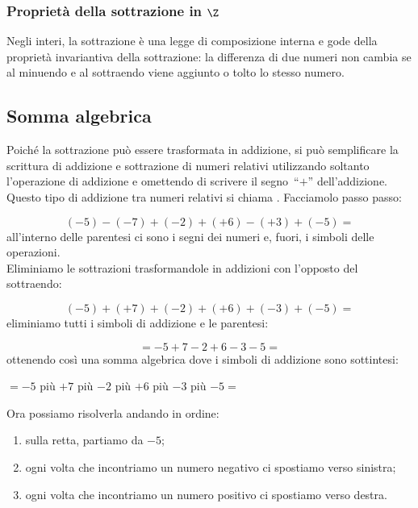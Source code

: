 \subsubsection{Proprietà della sottrazione in \texorpdfstring{$\Z$}{Z}}

Negli interi, la sottrazione è una legge di composizione interna e gode 
della proprietà invariantiva della 
sottrazione:
la differenza di due numeri non cambia se al minuendo e al sottraendo viene 
aggiunto o tolto lo stesso numero.

\subsection{Somma algebrica}

Poiché la sottrazione può essere trasformata in addizione, si può 
semplificare la scrittura di addizione e sottrazione di numeri relativi 
utilizzando soltanto l'operazione di addizione e omettendo di scrivere
il segno~``\(+\)'' dell'addizione. 
Questo tipo di addizione tra numeri relativi si chiama .
Facciamolo passo passo:

\vspace{-1em}
\[(-5)-(-7)+(-2)+(+6)-(+3)+(-5) =\]
all'interno delle parentesi ci sono i segni dei numeri e, fuori, i simboli 
delle operazioni.\\
Eliminiamo le sottrazioni trasformandole in addizioni 
con l'opposto del sottraendo:

\vspace{-1em}
\[(-5)+(+7)+(-2)+(+6)+(-3)+(-5) =\]
eliminiamo tutti i simboli di addizione e le parentesi: 

\vspace{-1em}
\[=-5+7-2+6-3-5 =\]
ottenendo così una somma algebrica dove i simboli di addizione sono 
sottintesi: 

\vspace{-1em}
\begin{center}
\(= -5\) \quad più \quad \(+7\) \quad più \quad \(-2\) \quad più \quad 
\(+6\) \quad più \quad \(-3\) \quad più \quad \(-5 =\)\\
\end{center}

Ora possiamo risolverla andando in ordine:
\begin{enumerate} [nosep]
\item sulla retta, partiamo da \(-5\);
\item ogni volta che incontriamo un numero negativo ci spostiamo verso 
sinistra; 
\item ogni volta che incontriamo un numero positivo ci spostiamo verso 
destra.
\end{enumerate}

